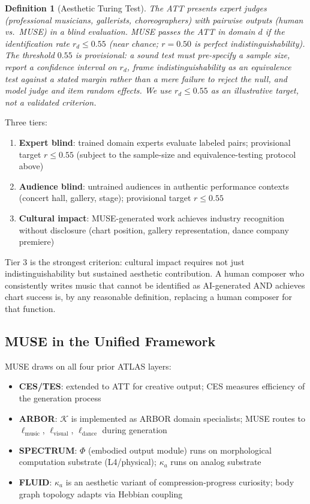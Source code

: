 \documentclass[12pt]{article}
\newtheorem{definition}{Definition}
\begin{document}
\begin{definition}[Aesthetic Turing Test]
The ATT presents expert judges (professional musicians, gallerists, choreographers) with pairwise outputs (human vs.\ MUSE) in a blind evaluation. MUSE passes the ATT in domain $d$ if the identification rate $r_d \leq 0.55$ (near chance; $r = 0.50$ is perfect indistinguishability). The threshold $0.55$ is provisional: a sound test must pre-specify a sample size, report a confidence interval on $r_d$, frame indistinguishability as an equivalence test against a stated margin rather than a mere failure to reject the null, and model judge and item random effects. We use $r_d \leq 0.55$ as an illustrative target, not a validated criterion.
\end{definition}

Three tiers:
\begin{enumerate}
    \item \textbf{Expert blind}: trained domain experts evaluate labeled pairs; provisional target $r \leq 0.55$ (subject to the sample-size and equivalence-testing protocol above)
    \item \textbf{Audience blind}: untrained audiences in authentic performance contexts (concert hall, gallery, stage); provisional target $r \leq 0.55$
    \item \textbf{Cultural impact}: MUSE-generated work achieves industry recognition without disclosure (chart position, gallery representation, dance company premiere)
\end{enumerate}

Tier 3 is the strongest criterion: cultural impact requires not just indistinguishability but sustained aesthetic contribution. A human composer who consistently writes music that cannot be identified as AI-generated AND achieves chart success is, by any reasonable definition, replacing a human composer for that function.

\subsection{MUSE in the Unified Framework}

MUSE draws on all four prior ATLAS layers:
\begin{itemize}
    \item \textbf{CES/TES}: extended to ATT for creative output; CES measures efficiency of the generation process
    \item \textbf{ARBOR}: $\mathcal{K}$ is implemented as ARBOR domain specialists; MUSE routes to $\ell_{\text{music}}$, $\ell_{\text{visual}}$, $\ell_{\text{dance}}$ during generation
    \item \textbf{SPECTRUM}: $\Phi$ (embodied output module) runs on morphological computation substrate (L4/physical); $\kappa_a$ runs on analog substrate
    \item \textbf{FLUID}: $\kappa_a$ is an aesthetic variant of compression-progress curiosity; body graph topology adapts via Hebbian coupling
\end{itemize}
\end{document}
